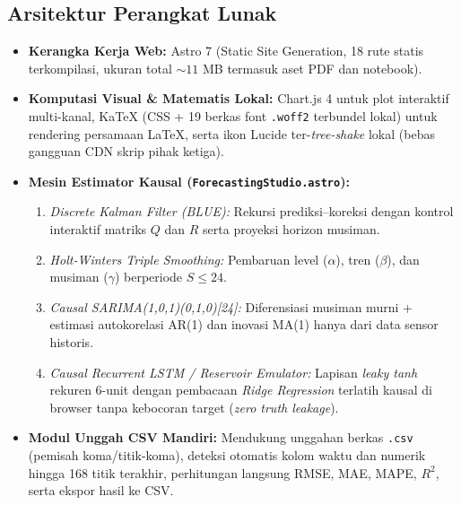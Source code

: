 \documentclass[11pt,a4paper]{article}
\begin{document}
\subsection{Arsitektur Perangkat Lunak}
\begin{itemize}[leftmargin=1.5em, itemsep=2pt]
    \item \textbf{Kerangka Kerja Web:} Astro 7 (Static Site Generation, 18 rute statis terkompilasi, ukuran total $\sim 11$ MB termasuk aset PDF dan notebook).
    \item \textbf{Komputasi Visual \& Matematis Lokal:} Chart.js 4 untuk plot interaktif multi-kanal, KaTeX (CSS + 19 berkas font \texttt{.woff2} terbundel lokal) untuk rendering persamaan LaTeX, serta ikon Lucide ter-\textit{tree-shake} lokal (bebas gangguan CDN skrip pihak ketiga).
    \item \textbf{Mesin Estimator Kausal (\texttt{ForecastingStudio.astro}):}
    \begin{enumerate}[label=(\alph*)]
        \item \textit{Discrete Kalman Filter (BLUE):} Rekursi prediksi--koreksi dengan kontrol interaktif matriks $Q$ dan $R$ serta proyeksi horizon musiman.
        \item \textit{Holt-Winters Triple Smoothing:} Pembaruan level ($\alpha$), tren ($\beta$), dan musiman ($\gamma$) berperiode $S \le 24$.
        \item \textit{Causal SARIMA(1,0,1)(0,1,0)[24]:} Diferensiasi musiman murni + estimasi autokorelasi AR(1) dan inovasi MA(1) hanya dari data sensor historis.
        \item \textit{Causal Recurrent LSTM / Reservoir Emulator:} Lapisan \textit{leaky tanh} rekuren 6-unit dengan pembacaan \textit{Ridge Regression} terlatih kausal di browser tanpa kebocoran target (\textit{zero truth leakage}).
    \end{enumerate}
    \item \textbf{Modul Unggah CSV Mandiri:} Mendukung unggahan berkas \texttt{.csv} (pemisah koma/titik-koma), deteksi otomatis kolom waktu dan numerik hingga 168 titik terakhir, perhitungan langsung RMSE, MAE, MAPE, $R^2$, serta ekspor hasil ke CSV.
\end{itemize}
\end{document}
